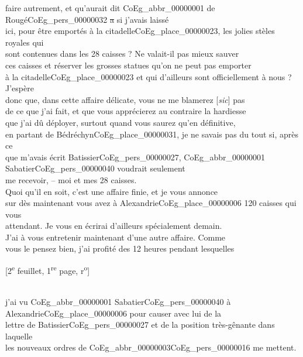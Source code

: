 \documentclass{book}
\begin{document}
faire autrement, et qu’aurait dit \gls{CoEg_abbr_00000001} de Rougé\gls{CoEg_pers_00000032} \sout{a} si j’avais laissé\\
ici, pour être emportés à la citadelle\gls{CoEg_place_00000023}, les jolies stèles royales qui\\
sont contenues dans les 28 caisses ? Ne valait-il pas mieux sauver\\
ces caisses et réserver les grosses statues qu’on ne peut pas emporter\\
à la citadelle\gls{CoEg_place_00000023} et qui d’ailleurs sont officiellement à nous ? J’espère\\
donc que, dans cette affaire délicate, vous ne me blamerez {[\textit{sic}]} pas\\
de ce que j’ai fait, et que vous apprécierez au contraire la hardiesse\\
que j’ai dû déployer, surtout quand vous saurez qu’en définitive,\\
en partant de Bédréchyn\gls{CoEg_place_00000031}, je ne savais pas du tout si, après ce\\
que m’avais écrit Batissier\gls{CoEg_pers_00000027}, \gls{CoEg_abbr_00000001} Sabatier\gls{CoEg_pers_00000040} voudrait seulement\\
me recevoir, – moi et mes 28 caisses.\\
\indent Quoi qu’il en soit, c’est une affaire finie, et je vous annonce\\
sur dès maintenant vous avez à Alexandrie\gls{CoEg_place_00000006} 120 caisses qui vous\\
attendant. Je vous en écrirai d’ailleurs spécialement demain.\\
\indent J’ai à vous entretenir maintenant d’une autre affaire. Comme\\
vous le pensez bien, j’ai profité des 12 heures pendant lesquelles
{\footnotesize\begin{center} {[2\textsuperscript{e} feuillet, 1\textsuperscript{re} page, r\textsuperscript{o}]}\end{center}}
\noindent {}\\
\noindent j’ai vu \gls{CoEg_abbr_00000001} Sabatier\gls{CoEg_pers_00000040} à Alexandrie\gls{CoEg_place_00000006} pour causer avec lui de la\\
lettre de Batissier\gls{CoEg_pers_00000027} et de la position très-gênante dans laquelle\\
les nouveaux ordres de \gls{CoEg_abbr_00000003}\gls{CoEg_pers_00000016} me mettent.\\
\end{document}

